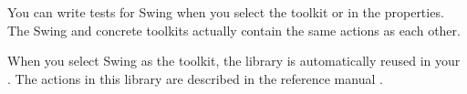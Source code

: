 You can write tests for Swing \gdauts{} when you select the toolkit  or  in the \gdproject{} properties. The Swing and concrete toolkits actually contain the same actions as each other. 

When you select Swing as the \gdproject{} toolkit, the library \gdproject{}  is automatically reused in your \gdproject{}. The actions in this library are described in the reference manual .
